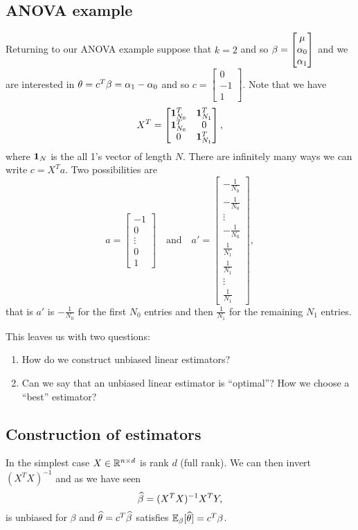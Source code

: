 \subsection{ANOVA example}
Returning to our ANOVA example suppose that $k=2$ and so $\beta = \begin{bmatrix}
    \mu\\{\alpha}_0\\ {\alpha}_1
\end{bmatrix}$ and we are interested in ${\theta} = c^T\beta = {\alpha}_1 - {\alpha}_0$ and so $c = \begin{bmatrix}
    0\\-1\\1
\end{bmatrix}$. Note that we have
\[X^T = \begin{bmatrix*}
    \one_{N_0}^T&\one_{N_1}^T\\
    \one_{N_0}^T&0\\
    0&\one_{N_1}^T
\end{bmatrix*}, \]
where ${{\bf 1}}_N$ is the all 1's vector of length $N$. There are infinitely many ways we can write $c = X^Ta$. Two possibilities are
\[a=\begin{bmatrix*}
    -1\\0\\\vdots\\0\\1
\end{bmatrix*} \quad \text{and} \quad 
a' = \begin{bmatrix*}
    -\frac{1}{N_0}\\-\frac{1}{N_0}\\ \vdots \\ -\frac{1}{N_0}\\\frac{1}{N_1} \\ \frac{1}{N_1} \\ \vdots \\ \frac{1}{N_1}
\end{bmatrix*},\]
that is $a'$ is $-\frac{1}{N_0}$ for the first $N_0$ entries and then $\frac{1}{N_1}$ for the remaining $N_1$ entries.

This leaves us with two questions:
\begin{enumerate}
    \item How do we construct unbiased linear estimators?
    \item Can we say that an unbiased linear estimator is ``optimal''? How we choose a ``best'' estimator?
\end{enumerate}
\subsection{Construction of estimators}
In the simplest case $X \in {\mathbb R}^{n \times d}$ is rank $d$ (full rank). We can then invert $(X^TX)^{-1}$ and as we have seen 
\[\widehat{\beta} = (X^TX)^{-1}X^TY,\]
is unbiased for $\beta$ and $\widehat{{\theta}} = c^T\widehat{\beta}$ satisfies ${\mathbb{E}}_\beta[\widehat{{\theta}}] = c^T\beta$. 

